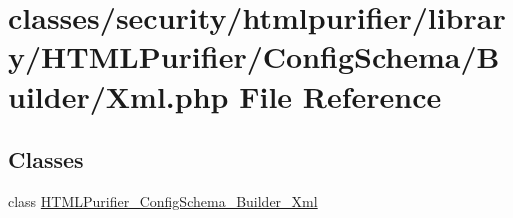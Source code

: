 \hypertarget{Xml_8php}{\section{classes/security/htmlpurifier/library/\+H\+T\+M\+L\+Purifier/\+Config\+Schema/\+Builder/\+Xml.php File Reference}
\label{Xml_8php}
}
\subsection*{Classes}
\begin{DoxyCompactItemize}
\item 
class \hyperlink{classHTMLPurifier__ConfigSchema__Builder__Xml}{H\+T\+M\+L\+Purifier\+\_\+\+Config\+Schema\+\_\+\+Builder\+\_\+\+Xml}
\end{DoxyCompactItemize}
